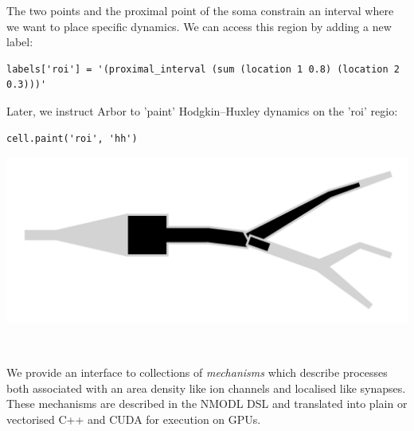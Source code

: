 \documentclass{beamer}
\newcommand*\circled[1]{\tikz[baseline=(char.base)]{\node[shape=circle,fill,inner sep=2pt] (char) {\textcolor{white}{#1}};}} %
\begin{document}
\begin{frame}[t, fragile]
\begin{columns}[onlytextwidth,T]
        \begin{column}{0.3\textwidth}
          \circled{3} The two points and the proximal point of the soma constrain an interval where we want to place specific dynamics. We can access this region by adding a new label:
\begin{verbatim}
labels['roi'] = '(proximal_interval (sum (location 1 0.8) (location 2 0.3)))'
\end{verbatim}
          Later, we instruct Arbor to 'paint' Hodgkin–Huxley dynamics on the 'roi' regio:
\begin{verbatim}
cell.paint('roi', 'hh')
\end{verbatim}
          \begin{center}\includegraphics[width=0.8\linewidth]{scripts/region.pdf}\end{center}
        \end{column}

      \end{columns}

  \begin{columns}[onlytextwidth,T]
    \begin{column}{.49\linewidth}
      \textbf{}\\
      We provide an interface to collections of \emph{mechanisms} which describe
      processes both associated with an area density like ion channels and
      localised like synapses. These mechanisms are described in the NMODL DSL
      and translated into plain or vectorised C++ and CUDA for execution on GPUs.


\end{column}
\end{columns}
\end{frame}
\end{document}

